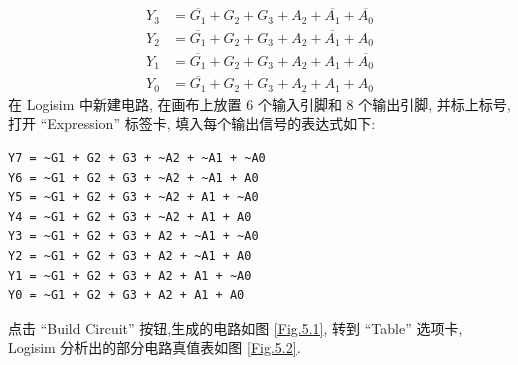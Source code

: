 \documentclass[UTF8,fontset=fandol]{ctexart}
\begin{document}
\begin{ExQuestions}
\begin{align*}
    Y_3 &= \overline{G_1} + {G_2} + {G_3} + {A_2} + \overline{A_1} + \overline{A_0} \\
    Y_2 &= \overline{G_1} + {G_2} + {G_3} + {A_2} + \overline{A_1} + {A_0} \\
    Y_1 &= \overline{G_1} + {G_2} + {G_3} + {A_2} + {A_1} + \overline{A_0} \\
    Y_0 &= \overline{G_1} + {G_2} + {G_3} + {A_2} + {A_1} + {A_0}
  \end{align*}
  在 Logisim 中新建电路, 在画布上放置 6 个输入引脚和 8 个输出引脚, 并标上标号, 打开 ``Expression'' 标签卡, 填入每个输出信号的表达式如下:
  \begin{lstlisting}[basicstyle = \small\ttfamily]
Y7 = ~G1 + G2 + G3 + ~A2 + ~A1 + ~A0
Y6 = ~G1 + G2 + G3 + ~A2 + ~A1 + A0
Y5 = ~G1 + G2 + G3 + ~A2 + A1 + ~A0
Y4 = ~G1 + G2 + G3 + ~A2 + A1 + A0
Y3 = ~G1 + G2 + G3 + A2 + ~A1 + ~A0
Y2 = ~G1 + G2 + G3 + A2 + ~A1 + A0
Y1 = ~G1 + G2 + G3 + A2 + A1 + ~A0
Y0 = ~G1 + G2 + G3 + A2 + A1 + A0
  \end{lstlisting}
  点击 ``Build Circuit'' 按钮,生成的电路如图 \ref{Fig.5.1}, 转到 ``Table'' 选项卡, Logisim 分析出的部分电路真值表如图 \ref{Fig.5.2}.
  \begin{figure}[H]
    \centering
    \label{Fig.5}
\end{figure}
\end{ExQuestions}
\end{document}
